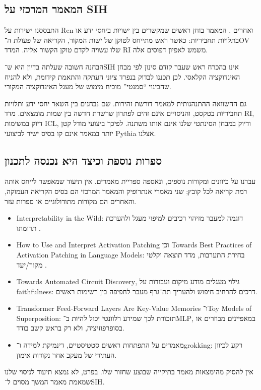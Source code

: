 \documentclass[11pt,a4paper]{article}
\newcommand{\en}[1]{\textenglish{#1}}
\begin{document}
\subsection{המאמר המרכזי על SIH}
התבססנו ישירות על Ren ואחרים \cite{ren}. המאמר בוחן ראשים שמקשרים בין ישויות ביחסי ידע או בתלויות תחביריות: כאשר ראש מתייחס לטוקן של ישות המקור, הקריאה של פעולת ה־\en{OV} שלו עשויה לקדם טוקן הקשור אליה. המדד \en{RI} משמש לאפיון דפוסים אלה.

הבחנה חשובה שעלתה בדיון היא ש־\en{SIH} אינו בהכרח ראש שעבר קודם סינון לפי מבחן האינדוקציה הקלאסי. לכן תכננו לבדוק בנפרד ציוני העתקה והתאמת קידומת, ולא להניח שהכינוי ``סמנטי'' מוכיח מימוש של מעגל האינדוקציה המקורי.

גם ההשוואה ההתנהגותית למאמר דורשת זהירות. שם נבחנים בין השאר יחסי ידע ותלויות תחביריות בטקסט, והניסויים אינם זהים לפתרון שרשרת חדשה בין שמות מומצאים. מדד \en{RI}, דיוק במשימות \en{ICL}, ודיוק במבחן הסינתטי שלנו אינם אותו משתנה. לפיכך ביצועי מודל קטן יותר במאמר אינם קו בסיס ישיר לביצועי \en{Pythia} אצלנו.

\subsection{ספרות נוספת וכיצד היא נכנסה לתכנון}
עברנו על כיוונים ומקורות נוספים, ונאספה ספריית מאמרים. אין תיעוד שמאפשר לייחס אותה רמת קריאה לכל קובץ; שני מאמרי אנתרופיק והמאמר המרכזי הם בסיס הקריאה העמוקה, והאחרים הם מקורות מתודולוגיים או ספרות עזר.

\begin{itemize}
\item \en{Interpretability in the Wild}: דוגמה למעבר מזיהוי רכיבים למיפוי מעגל ולהערכת תרומתו \cite{ioi}.
\item \en{How to Use and Interpret Activation Patching} וכן \en{Towards Best Practices of Activation Patching in Language Models}: בחירת התערבות, מדד תוצאה וקלטי מקור/יעד \cite{patchguide}.
\item \en{Towards Automated Circuit Discovery}, גילוי מעגלים מודע מיקום ועבודות על \en{faithfulness}: דרכים להרחיב חיפוש ולהעריך תת־גרף מעבר לחפיפה בין רשימות ראשים.
\item \en{Transformer Feed-Forward Layers Are Key-Value Memories} ו־\en{Toy Models of Superposition}: תזכורת לכך שמידע רלוונטי יכול להיות ב־\en{MLP}, במאפיינים מבוזרים או בסופרפוזיציה, ולא רק בראש קשב בודד.
\item מאמרים על התפתחות ראשים סטטיסטיים, דינמיקת למידה ו־\en{grokking}: רקע לכיוון העתידי של מעקב אחר נקודות אימון.
\end{itemize}
אין להסיק מהימצאות מאמר בתיקייה שבוצע שחזור שלו. בפרט, לא נמצא תיעוד לניסוי שלנו שמאמת מאמר המשך מסוים ל־\en{SIH}.
\end{document}
